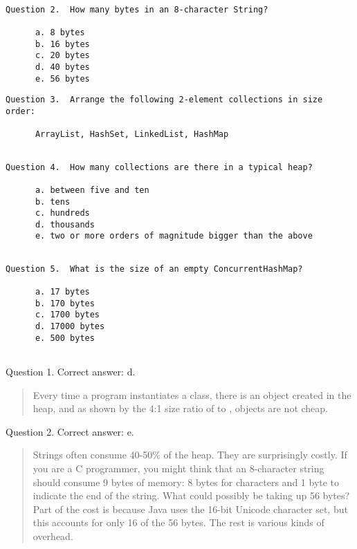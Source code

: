 \begin{verbatim}
   
Question 2.  How many bytes in an 8-character String?

      a. 8 bytes
      b. 16 bytes
      c. 20 bytes
      d. 40 bytes
      e. 56 bytes

\end{verbatim}

\begin{verbatim}             
Question 3.  Arrange the following 2-element collections in size order:
    
      ArrayList, HashSet, LinkedList, HashMap
      
\end{verbatim}

\begin{verbatim}      
Question 4.  How many collections are there in a typical heap?
   
      a. between five and ten
      b. tens
      c. hundreds
      d. thousands
      e. two or more orders of magnitude bigger than the above
      
\end{verbatim}

\begin{verbatim}
Question 5.  What is the size of an empty ConcurrentHashMap?
   
      a. 17 bytes
      b. 170 bytes
      c. 1700 bytes
      d. 17000 bytes
      e. 500 bytes
                 
\end{verbatim}

\newpage

Question 1.  Correct answer: d.

\begin{quote}
Every time
a program instantiates a class, there is an object created in the heap, and as
shown by the 4:1 size ratio of  to , objects are not
cheap.
\end{quote}

Question 2.  Correct answer: e.

\begin{quote}
Strings often consume 40-50\% of the heap. They are
surprisingly costly. If you are a C programmer, you might think that an 8-character string should 
consume 9 bytes
of memory: 8 bytes for characters and 1 byte to indicate the end of the string.
What could possibly be taking up 56 bytes? Part of the cost is because Java uses
the 16-bit Unicode character set, but this accounts for only 16 of the 56 bytes.
The rest is various kinds of overhead.
\end{quote}

